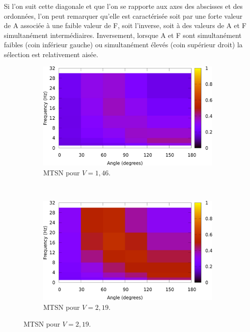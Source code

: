 	Si l'on suit cette diagonale et que l'on se rapporte aux axes des abscisses et des ordonnées, l'on peut remarquer qu'elle est caractérisée soit par une forte valeur de A associée à une faible valeur de F, soit l'inverse, soit à des valeurs de A et F simultanément intermédiaires. Inversement, lorsque A et F sont simultanément faibles (coin inférieur gauche) ou simultanément élevés (coin supérieur droit) la sélection est relativement aisée.

	\begin{figure}[!htb]
		\centering
		\begin{subfigure}[t]{\subImgWlineplot}
			\centering
			\includegraphics[width=\textwidth]{figures/ch4/average_times_054}
			\caption{MTSN pour $V = 1,46$.}
			\label{fig:hmap_t_146}
		\end{subfigure}
		~
		\begin{subfigure}[t]{\subImgWlineplot}
			\centering
			\includegraphics[width=\textwidth]{figures/ch4/average_times_081}
			\caption{MTSN pour $V = 2,19$.}
			\label{fig:hmap_t_219}
		\end{subfigure}

\end{figure}
